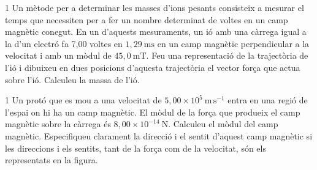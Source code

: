 \begin{apartat}{1}
Un mètode per a determinar les masses d'ions pesants consisteix a mesurar el temps que necessiten per a fer un nombre determinat de voltes en un camp magnètic conegut. En un d'aquests mesuraments, un ió amb una càrrega igual a la d'un electró fa 7,00 voltes en $1,29\ \mathrm{ms}$ en un camp magnètic perpendicular a la velocitat i amb un mòdul de $45,0\ \mathrm{mT}$. Feu una representació de la trajectòria de l'ió i dibuixeu en dues posicions d'aquesta trajectòria el vector força que actua sobre l'ió. Calculeu la massa de l'ió.
\end{apartat}

\begin{apartat}{1}
Un protó que es mou a una velocitat de $5,00\times 10^{5}\ \mathrm{m\,s^{-1}}$ entra en una regió de l'espai on hi ha un camp magnètic. El mòdul de la força que produeix el camp magnètic sobre la càrrega és $8,00\times 10^{-14}\ \mathrm{N}$. Calculeu el mòdul del camp magnètic. Especifiqueu clarament la direcció i el sentit d'aquest camp magnètic si les direccions i els sentits, tant de la força com de la velocitat, són els representats en la figura.

\end{apartat}

